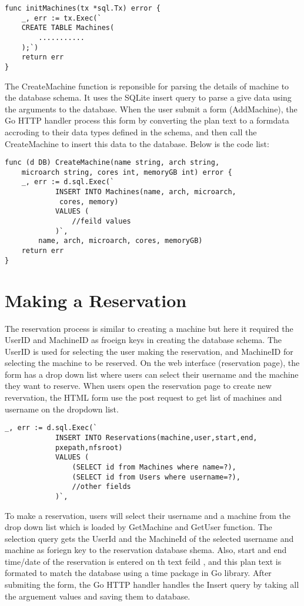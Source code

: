\begin{lstlisting}[caption=Creating Database for machine, label=Intitializing database]
func initMachines(tx *sql.Tx) error {
	_, err := tx.Exec(`
	CREATE TABLE Machines(
		...........
	);`)
	return err
}
\end{lstlisting}

The CreateMachine function is reponsible for parsing the details of machine to the database schema. It uses the SQLite insert query to parse a give data using the arguments to the database. When the user submit a form (AddMachine), the Go HTTP handler process this form by converting the plan text to a formdata accroding to their data types defined in the schema, and then call the CreateMachine to insert this data to the database. Below is the code list:
\begin{lstlisting}[caption=Adding machines details, label=Adding machine]
func (d DB) CreateMachine(name string, arch string,
	microarch string, cores int, memoryGB int) error {
	_, err := d.sql.Exec(`
			INSERT INTO Machines(name, arch, microarch,
			 cores, memory)
			VALUES (
				//feild values
			)`,
		name, arch, microarch, cores, memoryGB)
	return err
}
\end{lstlisting}

\section*{Making a Reservation}
The reservation process is similar to creating a machine but here it required the UserID and MachineID as froeign keys in creating the database schema. The UserID is used for selecting  the user making the reservation, and MachineID for selecting the machine to be reserved. On the web interface (reservation page), the form has a drop down list where users can select their username and the machine they want to reserve. When users open the reservation page to create new revervation, the HTML form use the post request to get list of machines and username on the dropdown list.
\begin{lstlisting}[caption=Storing Reservation details, label=Adding reservation]
	_, err := d.sql.Exec(`
			INSERT INTO Reservations(machine,user,start,end,
			pxepath,nfsroot)
			VALUES (
				(SELECT id from Machines where name=?),
				(SELECT id from Users where username=?),
				//other fields
			)`,
\end{lstlisting}

To make a reservation, users will select their username and a machine from the drop down list which is loaded by GetMachine and GetUser function. The selection query gets the UserId and the MachineId of the selected username and machine as foriegn key to the reservation database shema. Also, start and end time/date of the reservation is entered on th text feild , and this plan text is formated to match the database using a time package in Go library. After submiting the form, the Go HTTP handler handles the Insert query by taking all the arguement values and saving them to database. 
